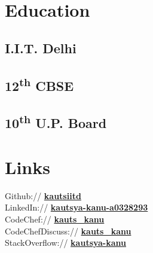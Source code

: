 \documentclass[]{Kauts}
\begin{document}
%
%

%
%

\begin{minipage}[t]{0.3\textwidth} 


\section{Education} 

\subsection{I.I.T. Delhi}

\subsection{}
\sectionsep

\subsection{12\textsuperscript{th} CBSE}
\sectionsep

\subsection{10\textsuperscript{th} U.P. Board}


\section{Links}
Github:// \href{https://github.com/kautsiitd}{\bf kautsiitd} \\
LinkedIn://  \href{https://www.linkedin.com/in/kautsya-kanu-a0328293}{\bf kautsya-kanu-a0328293} \\
CodeChef://  \href{https://www.codechef.com/users/kauts\_kanu}{\bf kauts\_kanu} \\
CodeChefDiscuss://  \href{https://discuss.codechef.com/users/70101/kauts\_kanu}{\bf kauts\_kanu} \\
StackOverflow://  \href{https://stackoverflow.com/users/4614493/kautsya-kanu?tab=profile}{\bf kautsya-kanu}


\end{minipage}
\end{document}

